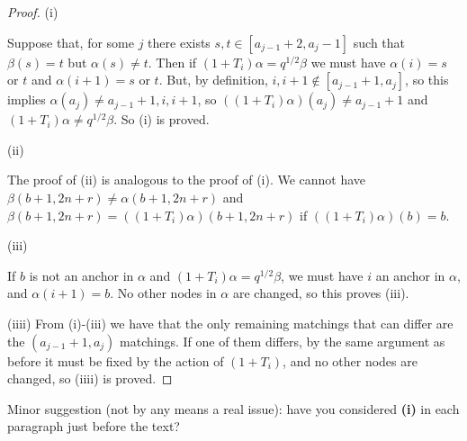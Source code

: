 \documentclass{amsart}
\begin{document}
\begin{proof}
	
	(i)
	
	Suppose that, for some $j$ there exists $s,t\in [a_{j-1}+2,a_j-1]$ such that $\beta(s)=t$ but $\alpha(s)\not=t$. Then if $(1+T_i)\alpha=q^{1/2}\beta$ we must have $\alpha(i)=s$ or $t$ and $\alpha(i+1)=s$ or $t$. But, by definition, $i,i+1\not\in[a_{j-1}+1,a_j]$, so this implies $\alpha(a_j)\not=a_{j-1}+1,i,i+1$, so $((1+T_i)\alpha)(a_j)\not=a_{j-1}+1$ and $(1+T_i)\alpha\not=q^{1/2}\beta$. So (i) is proved.
	
	\vspace{5mm}
	(ii)
	
	The proof of (ii) is analogous to the proof of (i). We cannot have $\beta(b+1,2n+r)\not=\alpha(b+1,2n+r)$ and $\beta(b+1,2n+r)=((1+T_i)\alpha)(b+1,2n+r)$ if $((1+T_i)\alpha)(b)=b$.
	
	\vspace{5mm}
	(iii)
	
	If $b$ is not an anchor in $\alpha$ and $(1+T_i)\alpha=q^{1/2}\beta$, we must have $i$ an anchor in $\alpha$, and $\alpha(i+1)=b$. No other nodes in $\alpha$ are changed, so this proves (iii).
	
	\vspace{5mm}
	(iiii)
	From (i)-(iii) we have that the only remaining matchings that can differ are the $(a_{j-1}+1,a_j)$ matchings. If one of them differs, by the same argument as before it must be fixed by the action of $(1+T_i)$, and no other nodes are changed, so (iiii) is proved.
	
\end{proof}
{\color{magenta} Minor suggestion (not by any means a real issue): have you considered \textbf{(i)} in each paragraph just before the text?}
\end{document}
